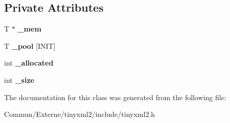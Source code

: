 \subsection*{Private Attributes}
\begin{DoxyCompactItemize}
\item 
T $\ast$ {\bfseries \+\_\+mem}\hypertarget{classtinyxml2_1_1_dyn_array_a2fe3376b05543f93edf3ba1bc4947e6d}{}\label{classtinyxml2_1_1_dyn_array_a2fe3376b05543f93edf3ba1bc4947e6d}

\item 
T {\bfseries \+\_\+pool} \mbox{[}I\+N\+IT\mbox{]}\hypertarget{classtinyxml2_1_1_dyn_array_ac00ff7104e1f9eb7a6d2e6f410cd7c12}{}\label{classtinyxml2_1_1_dyn_array_ac00ff7104e1f9eb7a6d2e6f410cd7c12}

\item 
int {\bfseries \+\_\+allocated}\hypertarget{classtinyxml2_1_1_dyn_array_a9bcaa041ce3fcd254328200debebc979}{}\label{classtinyxml2_1_1_dyn_array_a9bcaa041ce3fcd254328200debebc979}

\item 
int {\bfseries \+\_\+size}\hypertarget{classtinyxml2_1_1_dyn_array_a7177b0ed99f814eb04be4388f1f4320f}{}\label{classtinyxml2_1_1_dyn_array_a7177b0ed99f814eb04be4388f1f4320f}

\end{DoxyCompactItemize}


The documentation for this class was generated from the following file\+:\begin{DoxyCompactItemize}
\item 
Commun/\+Externe/tinyxml2/include/tinyxml2.\+h\end{DoxyCompactItemize}

